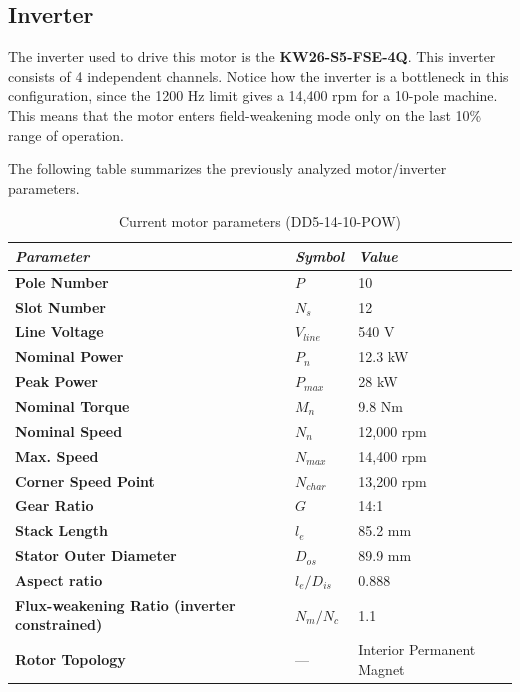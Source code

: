 \documentclass[11pt,a4paper]{article}
\begin{document}
\subsection{Inverter}
\label{sec:Inverter}
The inverter used to drive this motor is the \textbf{KW26-S5-FSE-4Q}. This inverter consists of 4 independent channels.
Notice how the inverter is a bottleneck in this configuration, since the 1200 Hz limit gives a 14,400 rpm for a 10-pole machine. This means that the motor enters field-weakening mode only on the last 10\% range of operation.

The following table summarizes the previously analyzed motor/inverter parameters.
\begin{table}[H]
\centering
\caption{Current motor parameters (DD5-14-10-POW)}
\label{tab:current_motor_data}
\begin{tabular}{p{4cm} l p{6.8cm}}
\hline
\textit{Parameter} & \textit{Symbol} & \textit{Value}\\ \hline
\textbf{Pole Number} & $P$ & 10 \\
\textbf{Slot Number} & $N_s$ & 12 \\
\textbf{Line Voltage} & $V_{line}$ & 540 V\\
\textbf{Nominal Power} & $P_{n}$ & 12.3 kW \\
\textbf{Peak Power} & $P_{max}$ & 28 kW \\
\textbf{Nominal Torque} & $M_{n}$ & 9.8 Nm \\
\textbf{Nominal Speed} & $N_{n}$ & 12,000 rpm \\
\textbf{Max. Speed} & $N_{max}$ & 14,400 rpm \\
\textbf{Corner Speed Point} & $N_{char}$ & 13,200 rpm \\
\textbf{Gear Ratio} & $G$ & 14:1 \\
\textbf{Stack Length} & $l_e$ & 85.2 mm \\
\textbf{Stator Outer Diameter} & $D_{os}$ & 89.9 mm \\
\textbf{Aspect ratio} & $l_e/D_{is}$ & 0.888 \\
\textbf{Flux-weakening Ratio (inverter constrained)} & $N_m/N_c$ & 1.1 \\
\textbf{Rotor Topology} & --- & Interior Permanent Magnet \\ \hline
\end{tabular}
\end{table}
\end{document}
